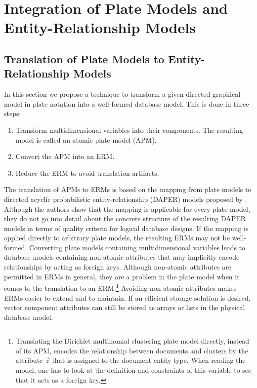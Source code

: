 \section{Integration of Plate Models and Entity-Relationship Models}

\subsection{Translation of Plate Models to Entity-Relationship Models}
\label{sec:pm2erm}

In this section we propose a technique to transform a given directed graphical model in plate notation into a well-formed database model. This is done in three steps:
\begin{enumerate}
\item Transform multidimensional variables into their components. The resulting model is called an atomic plate model (APM).
\item\label{itm:apm2erm} Convert the APM into an ERM.
\item Reduce the ERM to avoid translation artifacts.
\end{enumerate}
The translation of APMs to ERMs is based on the mapping from plate models to directed acyclic probabilistic entity-relationship (DAPER) models proposed by \textcite{heckerman2007probabilistic}. Although the authors show that the mapping is applicable for every plate model, they do not go into detail about the concrete structure of the resulting DAPER models in terms of quality criteria for logical database designs. If the mapping is applied directly to arbitrary plate models, the resulting ERMs may not be well-formed. Converting plate models containing multidimensional variables leads to database models containing non-atomic attributes that may implicitly encode relationships by acting as foreign keys. Although non-atomic attributes are permitted in ERMs in general, they are a problem in the plate model when it comes to the translation to an ERM.\footnote{Translating the Dirichlet multinomial clustering plate model directly, instead of its APM, encodes the relationship between documents and clusters by the attribute $\vec z$ that is assigned to the document entity type. When reading the model, one has to look at the definition and constraints of this variable to see that it acts as a foreign key.} Avoiding non-atomic attributes makes ERMs easier to extend and to maintain. If an efficient storage solution is desired, vector component attributes can still be stored as arrays or lists in the physical database model.

